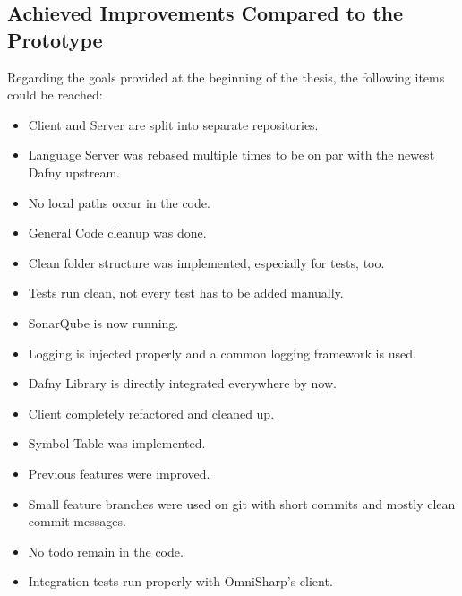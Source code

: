 \subsection{Achieved Improvements Compared to the Prototype}
Regarding the goals provided at the beginning of the thesis, the following items could be reached:
\begin{itemize}
    \item Client and Server are split into separate repositories.
    \item Language Server was rebased multiple times to be on par with the newest Dafny upstream.
    \item No local paths occur in the code.
    \item General Code cleanup was done.
    \item Clean folder structure was implemented, especially for tests, too.
    \item Tests run clean, not every test has to be added manually.
    \item SonarQube is now running.
    \item Logging is injected properly and a common logging framework is used.
    \item Dafny Library is directly integrated everywhere by now.
    \item Client completely refactored and cleaned up.
    \item Symbol Table was implemented.
    \item Previous features were improved.
    \item Small feature branches were used on git with short commits and mostly clean commit messages.
    \item No todo remain in the code.
    \item Integration tests run properly with OmniSharp's client.
\end{itemize}
